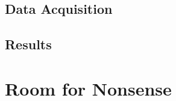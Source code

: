 \documentclass[a4paper,11pt]{article}
\begin{document}
\subsection{Data Acquisition}
\label{sec:evaluation:data}


\subsection{Results}
\label{sec:evaluation:results}


\section{Room for Nonsense}
\label{sec:nonsense}


\newpage
\printbibliography
\end{document}
